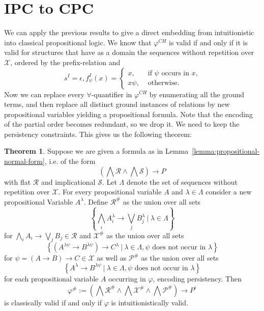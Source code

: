 \documentclass{easychair}
\theoremstyle{definition}
\newtheorem{theorem}{Theorem}[section]
\theoremstyle{definition}
\theoremstyle{definition}
\theoremstyle{definition}
\theoremstyle{definition}
\theoremstyle{definition}
\theoremstyle{definition}
\begin{document}
\section{IPC to CPC}
\label{sec:ipc-to-cpc}

We can apply the previous results to give a direct embedding from intuitionistic into classical propositional logic. We know that $\varphi^{CH}$ is valid if and only if it is valid for structures that have as a domain the sequences without repetition over $\mathcal X$, ordered by the prefix-relation and $$s^I = \epsilon, f_\psi^I(x) = \begin{cases}
	x, &\text{ if $\psi$ occurs in $x$,}\\
	x\psi, &\text{ otherwise.}
\end{cases}$$
Now we can replace every $\forall$-quantifier in $\varphi^{CH}$ by enumerating all the ground terms, and then replace all distinct ground instances of relations by new propositional variables yielding a propositional formula. Note that the encoding of the partial order becomes redundant, so we drop it. We need to keep the persistency constraints. This gives us the following theorem:

\begin{theorem}\label{thm:prop-translation}
	Suppose we are given a formula as in Lemma~\ref{lemma:propositional-normal-form}, i.e. of the form
	$$\left(\bigwedge\mathcal R\wedge\bigwedge\mathcal S\right)\to P$$
	with flat $\mathcal R$ and implicational $\mathcal S$. Let $\Lambda$ denote the set of sequences without repetition over $\mathcal X$. For every propositional variable $A$ and $\lambda\in\Lambda$ consider a new propositional Variable $A^\lambda$. Define $\mathcal R^\#$ as the union over all sets
	$$
		\left\{\bigwedge_iA_i^\lambda\to\bigvee_jB_j^\lambda\:|\:\lambda\in\Lambda\right\}
	$$
	for $\bigwedge_iA_i\to\bigvee_jB_j\in\mathcal R$ and $\mathcal X^\#$ as the union over all sets
	$$
		\left\{\left(A^{\lambda\psi} \to B^{\lambda\psi}\right)\to C^\lambda\:|\:\lambda\in\Lambda, \psi\text{ does not occur in }\lambda\right\}
	$$
	for $\psi = (A\to B)\to C\in\mathcal X$ as well as $\mathcal P^\#$ as the union over all sets
	$$
		\left\{A^\lambda\to B^{\lambda\psi}\:|\:\lambda\in\Lambda, \psi\text{ does not occur in }\lambda\right\}
	$$
	 for each propositional variable $A$ occurring in $\varphi$, encoding persistency. Then
	$$
		\varphi^\# := \left(\bigwedge \mathcal R^\#\wedge\bigwedge\mathcal X^\#\wedge\bigwedge \mathcal P^\#\right)\to P^\epsilon
	$$
	is classically valid if and only if $\varphi$ is intuitionistically valid.
\end{theorem}
\end{document}
